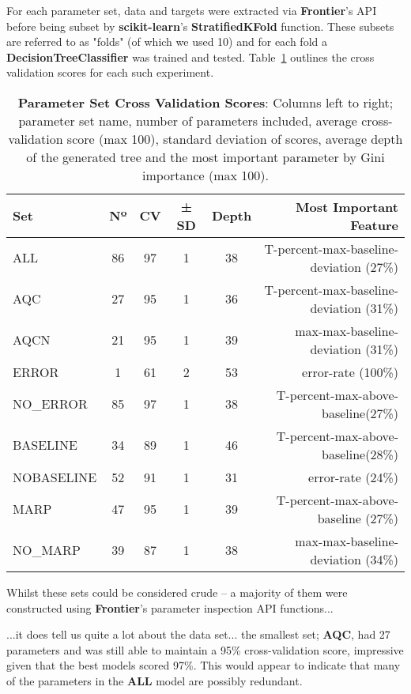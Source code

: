 For each parameter set, data and targets were extracted via \textbf{Frontier}'s
API before being subset by \textbf{scikit-learn}'s \textbf{StratifiedKFold}
function. These subsets are referred to as "folds" (of which we used 10) and for
each fold a \textbf{DecisionTreeClassifier} was trained and tested.
Table~\ref{tab:pset-cv} outlines the cross validation scores for each such
experiment.

\begin{table}
    \centering
    \begin{tabular}{l | c  c  c  c  r}
        Set           & Nº & CV  & ± SD & Depth & Most Important Feature\\
        \hline
        ALL           & 86 & 97 & 1 & 38 & T-percent-max-baseline-deviation (27\%)\\
        AQC           & 27 & 95 & 1 & 36 & T-percent-max-baseline-deviation (31\%)\\
        AQCN          & 21 & 95 & 1 & 39 & max-max-baseline-deviation (31\%)\\
        ERROR         & 1  & 61 & 2 & 53 & error-rate (100\%)\\
        NO\_ERROR     & 85 & 97 & 1 & 38 & T-percent-max-above-baseline(27\%)\\
        BASELINE      & 34 & 89 & 1 & 46 & T-percent-max-above-baseline(28\%)\\
        NOBASELINE    & 52 & 91 & 1 & 31 & error-rate (24\%)\\
        MARP          & 47 & 95 & 1 & 39 & T-percent-max-above-baseline (27\%)\\
        NO\_MARP      & 39 & 87 & 1 & 38 & max-max-baseline-deviation (34\%)\\
    \end{tabular}
    \caption[pset-cv]{\textbf{Parameter Set Cross Validation Scores}: Columns
        left to right; parameter set name, number of parameters included,
        average cross-validation score (max 100), standard deviation of scores,
        average depth of the generated tree and the most important parameter by
        Gini importance (max 100).}
    \label{tab:pset-cv}
\end{table}

Whilst these sets could be considered crude -- a majority of them were
constructed using \textbf{Frontier}'s parameter inspection API functions...

...it does tell us quite a lot about the data set...
the smallest set; \textbf{AQC}, had 27 parameters and was still able to maintain
a 95\% cross-validation score, impressive given that the best models scored
97\%. This would appear to indicate that many of the parameters in the
\textbf{ALL} model are possibly redundant.


